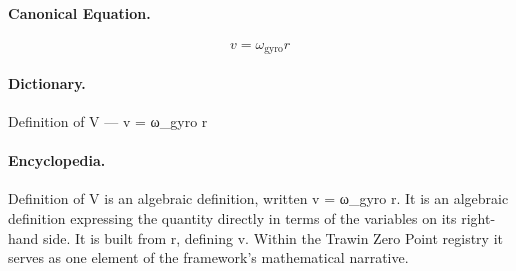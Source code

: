 \paragraph{Canonical Equation.}
\[
v = \omega_\text{gyro} r
\]

\paragraph{Dictionary.}
Definition of V — v = ω\_gyro r

\paragraph{Encyclopedia.}
Definition of V is an algebraic definition, written v = ω\_gyro r. It is an algebraic definition expressing the quantity directly in terms of the variables on its right-hand side. It is built from r, defining v. Within the Trawin Zero Point registry it serves as one element of the framework's mathematical narrative.
